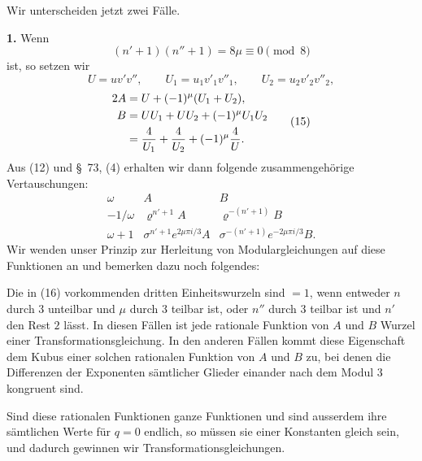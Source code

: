 \documentclass[11pt]{article}
\begin{document}
Wir unterscheiden jetzt zwei Fälle.

\noindent\textbf{1.} Wenn
\begin{equation}
 (n'+1)(n''+1)=8\mu\equiv0\pmod 8
\tag{13}
\end{equation}
ist, so setzen wir
\begin{equation}
 U=uv'v'',
 \qquad U_1=u_1v'_1v''_1,
 \qquad U_2=u_2v'_2v''_2,
\tag{14}
\end{equation}
\begin{equation}
\begin{aligned}
2A&=U+(-1)^\mu(U_1+U_2),\\
B&=UU_1+UU_2+(-1)^\mu U_1U_2\\
&={4\over U_1}+{4\over U_2}+(-1)^\mu{4\over U}.
\end{aligned}
\tag{15}
\end{equation}
Aus (12) und \S~73, (4) erhalten wir dann folgende zusammengehörige Vertauschungen:
\begin{equation}
\begin{array}{c|cc}
\omega&A&B\\[0.2em]
-1/\omega&\varrho^{n'+1}A&\varrho^{-(n'+1)}B\\[0.2em]
\omega+1&\sigma^{n'+1}e^{2\mu\pi i/3}A&\sigma^{-(n'+1)}e^{-2\mu\pi i/3}B.
\end{array}
\tag{16}
\end{equation}
Wir wenden unser Prinzip zur Herleitung von Modulargleichungen auf diese Funktionen an und bemerken dazu noch folgendes:

Die in (16) vorkommenden dritten Einheitswurzeln sind $=1$, wenn entweder $n$ durch $3$ unteilbar und $\mu$ durch $3$ teilbar ist, oder $n''$ durch $3$ teilbar ist und $n'$ den Rest $2$ lässt. In diesen Fällen ist jede rationale Funktion von $A$ und $B$ Wurzel einer Transformationsgleichung. In den anderen Fällen kommt diese Eigenschaft dem Kubus einer solchen rationalen Funktion von $A$ und $B$ zu, bei denen die Differenzen der Exponenten sämtlicher Glieder einander nach dem Modul $3$ kongruent sind.

Sind diese rationalen Funktionen ganze Funktionen und sind ausserdem ihre sämtlichen Werte für $q=0$ endlich, so müssen sie einer Konstanten gleich sein, und dadurch gewinnen wir Transformationsgleichungen.
\end{document}
